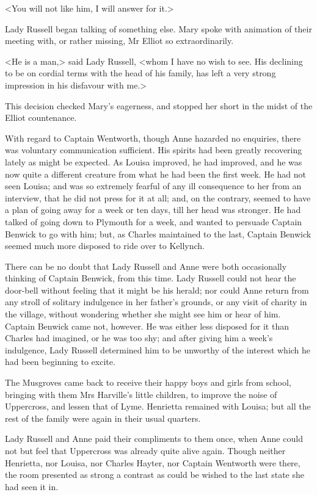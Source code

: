 <You will not like him, I will answer for it.>

Lady Russell began talking of something else. Mary spoke with animation of their meeting with, or rather missing, Mr Elliot so extraordinarily.

<He is a man,> said Lady Russell, <whom I have no wish to see. His declining to be on cordial terms with the head of his family, has left a very strong impression in his disfavour with me.>

This decision checked Mary's eagerness, and stopped her short in the midst of the Elliot countenance.

With regard to Captain Wentworth, though Anne hazarded no enquiries, there was voluntary communication sufficient. His spirits had been greatly recovering lately as might be expected. As Louisa improved, he had improved, and he was now quite a different creature from what he had been the first week. He had not seen Louisa; and was so extremely fearful of any ill consequence to her from an interview, that he did not press for it at all; and, on the contrary, seemed to have a plan of going away for a week or ten days, till her head was stronger. He had talked of going down to Plymouth for a week, and wanted to persuade Captain Benwick to go with him; but, as Charles maintained to the last, Captain Benwick seemed much more disposed to ride over to Kellynch.

There can be no doubt that Lady Russell and Anne were both occasionally thinking of Captain Benwick, from this time. Lady Russell could not hear the door-bell without feeling that it might be his herald; nor could Anne return from any stroll of solitary indulgence in her father's grounds, or any visit of charity in the village, without wondering whether she might see him or hear of him. Captain Benwick came not, however. He was either less disposed for it than Charles had imagined, or he was too shy; and after giving him a week's indulgence, Lady Russell determined him to be unworthy of the interest which he had been beginning to excite.

The Musgroves came back to receive their happy boys and girls from school, bringing with them Mrs Harville's little children, to improve the noise of Uppercross, and lessen that of Lyme. Henrietta remained with Louisa; but all the rest of the family were again in their usual quarters.

Lady Russell and Anne paid their compliments to them once, when Anne could not but feel that Uppercross was already quite alive again. Though neither Henrietta, nor Louisa, nor Charles Hayter, nor Captain Wentworth were there, the room presented as strong a contrast as could be wished to the last state she had seen it in.

